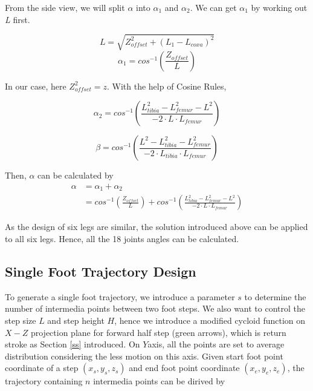 \documentclass[conference]{IEEEtran}
\begin{document}
From the side view, we will split \(\alpha\) into \(\alpha_1\) and \(\alpha_2\). We can get \(\alpha_1\) by working out \textit{L} first.

\begin{equation}
    L=\sqrt{Z^{2}_{offset} + (L_1 - L_{coxa})^2}
\end{equation}
\begin{equation}
    \alpha_1 = cos^{-1}(\frac{Z_{offset}}{L})
\end{equation}

In our case, here \(Z^{2}_{offset}=z\). With the help of Cosine Rules,

\begin{equation}
    \alpha_2 = cos^{-1}(\frac{L_{tibia}^2-L_{femur}^2 - L^2}{-2\cdot L \cdot L_{femur}})
\end{equation}

\begin{equation}
    \beta = cos^{-1}(\frac{ L^2-L_{tibia}^2-L_{femur}^2}{-2\cdot L_{tibia} \cdot L_{femur}})
\end{equation}

Then, \(\alpha\) can be calculated by 
\begin{equation}
    \begin{aligned}
        \alpha &= \alpha_1 + \alpha_2\\
        &= cos^{-1}(\frac{Z_{offset}}{L})+cos^{-1}(\frac{L_{tibia}^2-L_{femur}^2 - L^2}{-2\cdot L \cdot L_{femur}})
    \end{aligned}
\end{equation}

As the design of six legs are similar, the solution introduced above can be applied to all six legs. Hence, all the 18 joints angles can be calculated.

\subsection{Single Foot Trajectory Design}

To generate a single foot trajectory, we introduce a parameter \(s\) to determine the number of intermedia points between two foot steps. We also want to control the step size \(L\) and step height \(H\), hence we introduce a modified cycloid function on \(X-Z\) projection plane for forward half step (green arrows), which is return stroke as Section \ref{ss} introduced. On \(Y\)axis, all the points are set to average distribution considering the less motion on this axis. Given start foot point coordinate of a step \((x_s, y_s, z_s)\) and end foot point coordinate \((x_e, y_e, z_e)\), the trajectory containing \(n\) intermedia points can be dirived by 
\end{document}

